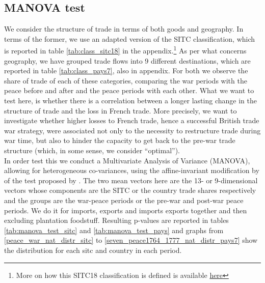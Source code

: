 \documentclass[12pt,a4paper,notitlepage,english]{article}
\begin{document}
\subsection{MANOVA test}
We consider the structure of trade in terms of both goods and geography. 
In terms of the former, we use an adapted version of the SITC classification, which is reported in table \ref{tab:class_sitc18} in the appendix.\footnote{More on how this SITC18 classification is defined is available \href{http://toflit18.medialab.sciences-po.fr/\#/home}{here}} As per what concerns geography, we have grouped trade flows into 9 different destinations, which are reported in table \ref{tab:class_pays7}, also in appendix. For both we observe the share of trade of each of these categories, comparing the war periods with the peace before and after and the peace periods with each other. 
What we want to test here, is whether there is a correlation between a longer lasting change in the structure of trade and the loss in French trade. More precisely, we want to investigate whether higher losses to French trade, hence a successful British trade war strategy, were associated not only to the necessity to restructure trade during war time, but also to hinder the capacity to get back to the pre-war trade structure (which, in some sense, we consider ``optimal''). \\
In order test this we conduct a Multivariate Analysis of Variance (MANOVA), allowing for heterogeneous co-variances, using the affine-invariant modification by \cite{Krishnamoorthy2004} of the test proposed by \cite{Nel1986}. The two mean vectors here are the 13- or 9-dimensional vectors whose components are the SITC or the country trade shares respectively and the groups are the war-peace periods or the pre-war and post-war peace periods. 
We do it for imports, exports and imports exports together and then excluding plantation foodstuff. Resulting p-values are reported in tables \ref{tab:manova_test_sitc} and \ref{tab:manova_test_pays} and graphs from \ref{peace_war_nat_distr_sitc} to \ref{seven_peace1764_1777_nat_distr_pays7} show the distribution for each sitc and country in each period. \\
\end{document}
